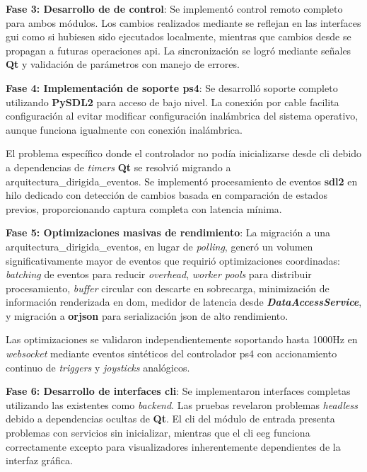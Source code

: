\textbf{Fase 3: Desarrollo de  de control}:
Se implementó control remoto completo para ambos módulos. Los cambios realizados mediante  se reflejan en las interfaces \acrshort{gui} como si hubiesen sido ejecutados localmente, mientras que cambios desde  se propagan a futuras operaciones \acrshort{api}. La sincronización se logró mediante señales \textbf{Qt} y validación de parámetros con manejo de errores.

\textbf{Fase 4: Implementación de soporte \acrshort{ps4}}:
Se desarrolló soporte completo utilizando \textbf{PySDL2} para acceso de bajo nivel. La conexión por cable facilita configuración al evitar modificar configuración inalámbrica del sistema operativo, aunque funciona igualmente con conexión inalámbrica.

El problema específico donde el controlador no podía inicializarse desde \acrshort{cli} debido a dependencias de \textit{\gls{timers}} \textbf{Qt} se resolvió migrando a \gls{arquitectura_dirigida_eventos}. Se implementó procesamiento de eventos \textbf{\acrshort{sdl}2} en hilo dedicado con detección de cambios basada en comparación de estados previos, proporcionando captura completa con latencia mínima.

\textbf{Fase 5: Optimizaciones masivas de rendimiento}:
La migración a una \gls{arquitectura_dirigida_eventos}, en lugar de \textit{\gls{polling}}, generó un volumen significativamente mayor de eventos que requirió optimizaciones coordinadas: \textit{\gls{batching}} de eventos para reducir \textit{\gls{overhead}}, \textit{\gls{worker} pools} para distribuir procesamiento, \textit{\gls{buffer}} circular con descarte en sobrecarga, minimización de información renderizada en \gls{dom}, medidor de latencia desde \textit{\textbf{DataAccessService}}, y migración a \textbf{orjson} para serialización \acrshort{json} de alto rendimiento.

Las optimizaciones se validaron independientemente soportando hasta 1000Hz en \textit{\gls{websocket}} mediante eventos sintéticos del controlador \acrshort{ps4} con accionamiento continuo de \textit{triggers} y \textit{joysticks} analógicos.

\textbf{Fase 6: Desarrollo de interfaces \acrshort{cli}}:
Se implementaron interfaces completas utilizando las  existentes como \textit{backend}. Las pruebas revelaron problemas \textit{\gls{headless}} debido a dependencias ocultas de \textbf{Qt}. El \acrshort{cli} del módulo de entrada presenta problemas con servicios sin inicializar, mientras que el \acrshort{cli} \acrshort{eeg} funciona correctamente excepto para visualizadores inherentemente dependientes de la interfaz gráfica.

